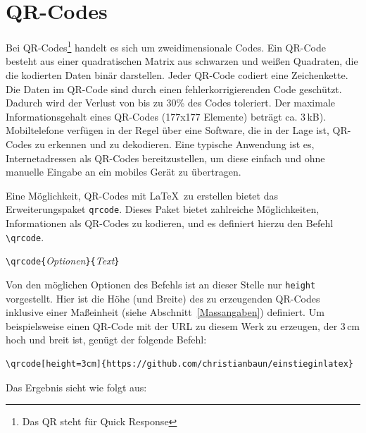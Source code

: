 \documentclass[a4paper,10pt,twoside]{scrbook}
\begin{document}
\section{QR-Codes}
\label{Abschnitt_QR-Code}

Bei QR-Codes\footnote{Das QR steht für Quick Response} handelt es sich um zweidimensionale Codes.
Ein QR-Code besteht aus einer quadratischen Matrix aus schwarzen und weißen Quadraten, die die kodierten Daten binär darstellen. Jeder QR-Code codiert eine Zeichenkette.
Die Daten im QR-Code sind durch einen fehlerkorrigierenden Code geschützt. 
Dadurch wird der Verlust von bis zu 30\% des Codes toleriert.
Der maximale Informationsgehalt eines QR-Codes (177x177 Elemente) beträgt ca. 3\,kB).~\cite{QRCode_Wikipedia}
Mobiltelefone verfügen in der Regel über eine Software, die in der 
Lage ist, QR-Codes zu erkennen und zu dekodieren. Eine typische Anwendung ist es, Internetadressen als
QR-Codes bereitzustellen, um diese einfach und ohne manuelle Eingabe an ein mobiles Gerät zu übertragen.

Eine Möglichkeit, QR-Codes mit \LaTeX\ zu erstellen bietet das Erweiterungspaket \verb!qrcode!. 
Dieses Paket bietet zahlreiche Möglichkeiten, Informationen als QR-Codes zu kodieren, und es definiert hierzu den 
Befehl \verb!\qrcode!.




\begin{boxedminipage}{\textwidth}
\texttt{\textbackslash qrcode\{}\textsl{Optionen}\texttt{\}\{}\textsl{Text}\texttt{\}}
\end{boxedminipage}


Von den möglichen Optionen des Befehls ist an dieser Stelle nur \verb!height! vorgestellt. Hier ist die Höhe (und Breite) des zu 
erzeugenden QR-Codes inklusive einer Maßeinheit 
(siehe Abschnitt~\ref{Massangaben}) definiert. Um beispielsweise einen QR-Code mit der URL zu diesem Werk zu erzeugen, der 3\,cm hoch und breit ist, 
genügt der folgende Befehl: 

\begin{lstlisting}[label=QRcode, style=customlatex]
\qrcode[height=3cm]{https://github.com/christianbaun/einstieginlatex}
\end{lstlisting}

Das Ergebnis sieht wie folgt aus:

\end{document}

